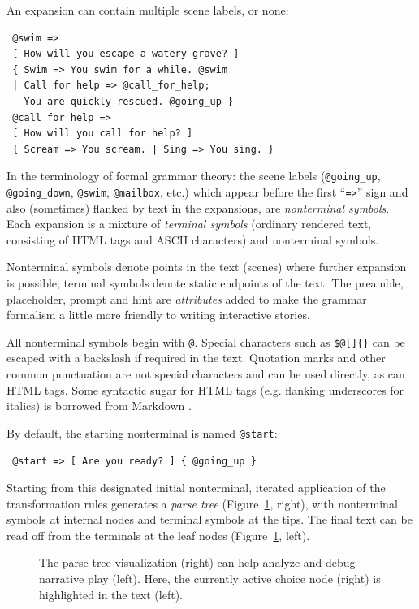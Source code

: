 \documentclass{acm_proc_article-sp}
\begin{document}
An expansion can contain multiple scene labels, or none:
\begin{verbatim}
 @swim =>
 [ How will you escape a watery grave? ]
 { Swim => You swim for a while. @swim
 | Call for help => @call_for_help;
   You are quickly rescued. @going_up }
 @call_for_help =>
 [ How will you call for help? ]
 { Scream => You scream. | Sing => You sing. }
\end{verbatim}


In the terminology of formal grammar theory: the scene labels ({\tt @going\_up}, {\tt @going\_down}, {\tt @swim}, {\tt @mailbox}, etc.) which appear before the first ``{\tt =>}'' sign and also (sometimes) flanked by text in the expansions, are {\em nonterminal symbols}.
Each expansion is a mixture of {\em terminal symbols} (ordinary rendered text, consisting of HTML tags and ASCII characters) and nonterminal symbols.

Nonterminal symbols denote points in the text (scenes) where further expansion is possible;
terminal symbols denote static endpoints of the text.
The preamble, placeholder, prompt and hint are {\em attributes}
added to make the grammar formalism a little more friendly to writing interactive stories.

All nonterminal symbols begin with {\tt @}.
Special characters such as {\tt \$@[]\{\}} can be escaped with a backslash if required in the text.
Quotation marks and other common punctuation are not special characters and can be used directly, as can HTML tags.
Some syntactic sugar for HTML tags (e.g. flanking underscores for italics) is borrowed from Markdown \cite{Markdown}.

By default, the starting nonterminal is named {\tt @start}:
\begin{verbatim}
 @start => [ Are you ready? ] { @going_up }
\end{verbatim}

Starting from this designated initial nonterminal,
iterated application of the transformation rules generates a {\em parse tree} (Figure~\ref{fig:tree}, right),
with nonterminal symbols at internal nodes and terminal symbols at the tips.
The final text can be read off from the terminals at the leaf nodes (Figure~\ref{fig:tree}, left).

\begin{figure}
\centerline{  }
\caption{
\label{fig:tree}
The parse tree visualization (right) can help analyze and debug narrative play (left).
Here, the currently active choice node (right) is highlighted in the text (left).
}
\end{figure}
\end{document}
